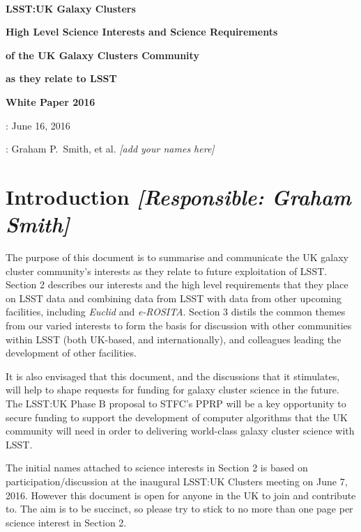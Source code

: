 \documentclass[a4paper,11pt]{article}
\begin{document}
\pagestyle{myheadings}

\sloppy

\pagestyle{empty}

~\vspace{70mm}

\centerline{\LARGE\bf LSST:UK Galaxy Clusters}
\bigskip\bigskip\bigskip
\centerline{\Large\bf High Level Science Interests and Science Requirements}
\medskip
\centerline{\Large\bf of the UK Galaxy Clusters Community}
\medskip
\centerline{\Large\bf as they relate to LSST}
\bigskip\bigskip\bigskip
\centerline{\Large\bf White Paper 2016}

\vspace{90mm}

\large
{}: June 16, 2016

: Graham P.\ Smith, et al. {\it [add your names here]}


\newpage
\pagestyle{myheadings}
\setlength{\topmargin}{-10mm}
\setlength{\textheight}{255mm}

\tableofcontents

\newpage

\section{Introduction {\it [Responsible: Graham Smith]}}

The purpose of this document is to summarise and communicate the UK
galaxy cluster community's interests as they relate to future
exploitation of LSST.  Section 2 describes our interests and the high
level requirements that they place on LSST data and combining data
from LSST with data from other upcoming facilities, including
\emph{Euclid} and \emph{e-ROSITA}.  Section 3 distils the common
themes from our varied interests to form the basis for discussion with
other communities within LSST (both UK-based, and internationally),
and colleagues leading the development of other facilities.

It is also envisaged that this document, and the discussions that it
stimulates, will help to shape requests for funding for galaxy cluster
science in the future.  The LSST:UK Phase B proposal to STFC's PPRP
will be a key opportunity to secure funding to support the development
of computer algorithms that the UK community will need in order to
delivering world-class galaxy cluster science with LSST.

The initial names attached to science interests in Section 2 is based
on participation/discussion at the inaugural LSST:UK Clusters meeting
on June 7, 2016.  However this document is open for anyone in the UK
to join and contribute to.  The aim is to be succinct, so please try
to stick to no more than one page per science interest in Section 2.
\end{document}
